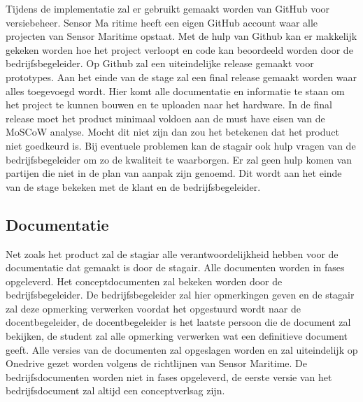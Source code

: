 \noindent Tijdens de implementatie zal er gebruikt gemaakt worden van GitHub voor versiebeheer. Sensor Ma ritime heeft een eigen GitHub account waar alle projecten van Sensor Maritime opstaat. Met de hulp van Github kan er makkelijk gekeken worden hoe het project verloopt en code kan beoordeeld worden door de bedrijfsbegeleider. Op Github zal een uiteindelijke release gemaakt voor prototypes. Aan het einde van de stage zal een final release gemaakt worden waar alles toegevoegd wordt. Hier komt alle documentatie en informatie te staan om het project te kunnen bouwen en te uploaden naar het hardware. In de final release moet het product minimaal voldoen aan de must have eisen van de MoSCoW analyse. Mocht dit niet zijn dan zou het betekenen dat het product niet goedkeurd is. Bij eventuele problemen kan de stagair ook hulp vragen van de bedrijfsbegeleider om zo de kwaliteit te waarborgen. Er zal geen hulp komen van partijen die niet in de plan van aanpak zijn genoemd. Dit wordt aan het einde van de stage bekeken met de klant en de bedrijfsbegeleider.

\subsection{Documentatie}
Net zoals het product zal de stagiar alle verantwoordelijkheid hebben voor de documentatie dat gemaakt is door de stagair. Alle documenten worden in fases opgeleverd. Het conceptdocumenten zal bekeken worden door de bedrijfsbegeleider. De bedrijfsbegeleider zal hier opmerkingen geven en de stagair zal deze opmerking verwerken voordat het opgestuurd wordt naar de docentbegeleider, de docentbegeleider is het laatste persoon die de document zal bekijken, de student zal alle opmerking verwerken wat een definitieve document geeft. Alle versies van de documenten zal opgeslagen worden en zal uiteindelijk op Onedrive gezet worden volgens de richtlijnen van Sensor Maritime. De bedrijfsdocumenten worden niet in fases opgeleverd, de eerste versie van het bedrijfsdocument zal altijd een conceptverlsag zijn.